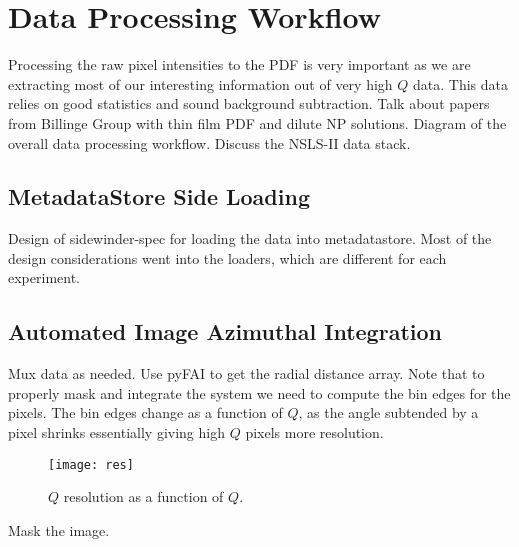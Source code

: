 \section{Data Processing Workflow}
Processing the raw pixel intensities to the PDF is very important as we are extracting most of our interesting information out of very high $Q$ data.
This data relies on good statistics and sound background subtraction.
Talk about papers from Billinge Group with thin film PDF and dilute NP solutions.
Diagram of the overall data processing workflow.
Discuss the NSLS-II data stack.
\begin{landscape}
\begin{center}
\end{center}
\end{landscape}
\subsection{MetadataStore Side Loading}
Design of sidewinder-spec for loading the data into metadatastore.
Most of the design considerations went into the loaders, which are different for each experiment.
\subsection{Automated Image Azimuthal Integration}
Mux data as needed. 
Use pyFAI to get the radial distance array.
Note that to properly mask and integrate the system we need to compute the bin edges for the pixels.
The bin edges change as a function of $Q$, as the angle subtended by a pixel shrinks essentially giving high $Q$ pixels more resolution.
\begin{figure}
  \texttt{[image: res]}
\caption{$Q$ resolution as a function of $Q$.}
\end{figure}
Mask the image.
